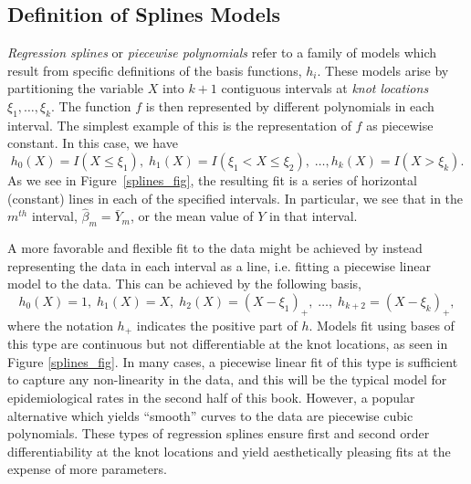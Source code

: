 \subsection{Definition of Splines Models}

\emph{Regression splines} or \emph{piecewise polynomials} refer to a
family of models which result from specific definitions of the basis
functions, $h_i$. These models arise by partitioning the variable $X$
into $k+1$ contiguous intervals at \emph{knot locations} $\xi_1,
\dots, \xi_{k}$. The function $f$ is then represented by different
polynomials in each interval. The simplest example of this is the
representation of $f$ as piecewise constant. In this case, we
have 
\[
h_0(X) = I(X \leq \xi_1),\; h_1(X)=I(\xi_1 < X \leq \xi_2), \;
\dots, h_{k}(X) = I(X > \xi_k). 
\]
As we see in Figure~\ref{splines_fig}, the resulting fit is a series
of horizontal (constant) lines in each of the specified intervals. In
particular, we see that in the $m^{th}$ interval, $\hat{\beta}_m =
\bar{Y}_m$, or the mean value of $Y$ in that interval.

A more favorable and flexible fit to the data might be achieved by
instead representing the data in each interval as a line, i.e. fitting
a piecewise linear model to the data. This can be achieved by the
following basis, 
\[
h_0(X) = 1,\; h_1(X) = X,\; h_2(X) = (X-\xi_1)_+,\; \dots,\; h_{k+2}=(X-\xi_k)_+,
\]
where the notation $h_+$ indicates the positive part of $h$. Models
fit using bases of this type are continuous but not differentiable at
the knot locations, as seen in Figure \ref{splines_fig}. In many
cases, a piecewise linear fit of this type is sufficient to capture
any non-linearity in the data, and this will be the typical model for
epidemiological rates in the second half of this book. However, a
popular alternative which yields ``smooth'' curves to the data are
piecewise cubic polynomials. These types of regression splines ensure
first and second order differentiability at the knot locations and
yield aesthetically pleasing fits at the expense of more parameters.


